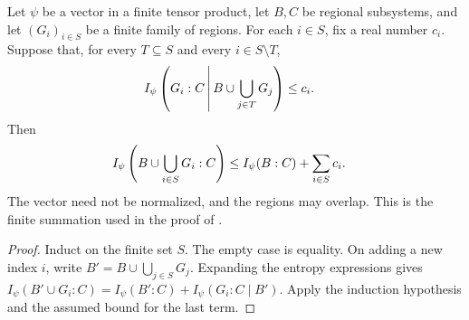 \begin{theorem}
    \label{thm:finite_product_conditional_cost_sum}
    \leanok
    Let $\psi$ be a vector in a finite tensor product, let $B,C$ be regional
    subsystems, and let $(G_i)_{i\in S}$ be a finite family of regions.
    For each $i\in S$, fix a real number $c_i$. Suppose that, for every
    $T\subseteq S$ and every $i\in S\setminus T$,
    \begin{align}
        I_\psi\left(G_i:C\,\middle|\,B\cup\bigcup_{j\in T}G_j\right)
         & \le c_i.
        \notag
    \end{align}
    Then
    \begin{align}
        I_\psi\left(B\cup\bigcup_{i\in S}G_i:C\right)
         & \le I_\psi(B:C)+\sum_{i\in S}c_i.
        \notag
    \end{align}
    The vector need not be normalized, and the regions may overlap.
    This is the finite summation used in the proof of
    \cite[Proposition~3.4]{OpenAI2026PolynomialPEPS}.
\end{theorem}
\begin{proof}\leanok
    Induct on the finite set $S$. The empty case is equality.
    On adding a new index $i$, write $B'=B\cup\bigcup_{j\in S}G_j$.
    Expanding the entropy expressions gives
    $I_\psi(B'\cup G_i:C)=I_\psi(B':C)+I_\psi(G_i:C\mid B')$.
    Apply the induction hypothesis and the assumed bound for the last term.
\end{proof}


